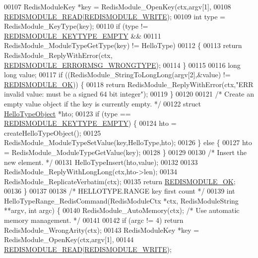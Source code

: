 \begin{DoxyCode}
00107     RedisModuleKey *key = RedisModule\_OpenKey(ctx,argv[1],
00108         \hyperlink{redismodule_8h_a369d2ff4bca768b05f826a12dd694825}{REDISMODULE\_READ}|\hyperlink{redismodule_8h_a73b37117ef94cb4a904361afcc51b6b4}{REDISMODULE\_WRITE});
00109     \textcolor{keywordtype}{int} type = RedisModule\_KeyType(key);
00110     \textcolor{keywordflow}{if} (type != \hyperlink{redismodule_8h_adf2819748eb5e89c621d2c9c65c0b5f7}{REDISMODULE\_KEYTYPE\_EMPTY} &&
00111         RedisModule\_ModuleTypeGetType(key) != HelloType)
00112     \{
00113         \textcolor{keywordflow}{return} RedisModule\_ReplyWithError(ctx,
      \hyperlink{redismodule_8h_ab897689b0673a1e4cbc097cb5bce04c1}{REDISMODULE\_ERRORMSG\_WRONGTYPE});
00114     \}
00115 
00116     \textcolor{keywordtype}{long} \textcolor{keywordtype}{long} value;
00117     \textcolor{keywordflow}{if} ((RedisModule\_StringToLongLong(argv[2],&value) != \hyperlink{redismodule_8h_a1bc5bfd69abcd378ff52c640adc5418d}{REDISMODULE\_OK})) \{
00118         \textcolor{keywordflow}{return} RedisModule\_ReplyWithError(ctx,\textcolor{stringliteral}{"ERR invalid value: must be a signed 64 bit integer"});
00119     \}
00120 
00121     \textcolor{comment}{/* Create an empty value object if the key is currently empty. */}
00122     \textcolor{keyword}{struct} \hyperlink{structHelloTypeObject}{HelloTypeObject} *hto;
00123     \textcolor{keywordflow}{if} (type == \hyperlink{redismodule_8h_adf2819748eb5e89c621d2c9c65c0b5f7}{REDISMODULE\_KEYTYPE\_EMPTY}) \{
00124         hto = createHelloTypeObject();
00125         RedisModule\_ModuleTypeSetValue(key,HelloType,hto);
00126     \} \textcolor{keywordflow}{else} \{
00127         hto = RedisModule\_ModuleTypeGetValue(key);
00128     \}
00129 
00130     \textcolor{comment}{/* Insert the new element. */}
00131     HelloTypeInsert(hto,value);
00132 
00133     RedisModule\_ReplyWithLongLong(ctx,hto->len);
00134     RedisModule\_ReplicateVerbatim(ctx);
00135     \textcolor{keywordflow}{return} \hyperlink{redismodule_8h_a1bc5bfd69abcd378ff52c640adc5418d}{REDISMODULE\_OK};
00136 \}
00137 
00138 \textcolor{comment}{/* HELLOTYPE.RANGE key first count */}
00139 \textcolor{keywordtype}{int} HelloTypeRange\_RedisCommand(RedisModuleCtx *ctx, RedisModuleString **argv, \textcolor{keywordtype}{int} argc) \{
00140     RedisModule\_AutoMemory(ctx); \textcolor{comment}{/* Use automatic memory management. */}
00141 
00142     \textcolor{keywordflow}{if} (argc != 4) \textcolor{keywordflow}{return} RedisModule\_WrongArity(ctx);
00143     RedisModuleKey *key = RedisModule\_OpenKey(ctx,argv[1],
00144         \hyperlink{redismodule_8h_a369d2ff4bca768b05f826a12dd694825}{REDISMODULE\_READ}|\hyperlink{redismodule_8h_a73b37117ef94cb4a904361afcc51b6b4}{REDISMODULE\_WRITE});

\end{DoxyCode}
